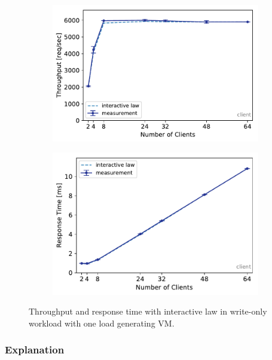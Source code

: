 \documentclass[report.tex]{subfiles}
\begin{document}
\begin{figure}
	\begin{subfigure}[b]{.49\linewidth}
		\centering
		\includegraphics[width=\linewidth]{data/exp22_wo_tp_nc.pdf}
	\end{subfigure}\hfill
	\begin{subfigure}[b]{.49\linewidth}
		\centering
		\includegraphics[width=\linewidth]{data/exp22_wo_rt_nc.pdf}
	\end{subfigure}%
	\caption{Throughput and response time with interactive law in write-only workload with one load generating VM.}
	\label{exp22_wo_nc}
\end{figure}



\subsubsection{Explanation}
\end{document}
